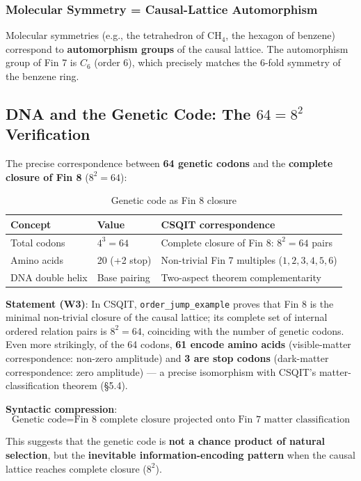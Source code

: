\documentclass[aps,prd,twocolumn,nofootinbib,floatfix]{revtex4-2}
\begin{document}
\subsubsection{Molecular Symmetry = Causal-Lattice Automorphism}

Molecular symmetries (e.g., the tetrahedron of CH$_4$, the hexagon of benzene) correspond to \textbf{automorphism groups} of the causal lattice. The automorphism group of Fin 7 is $C_6$ (order 6), which precisely matches the 6-fold symmetry of the benzene ring.

\subsection{DNA and the Genetic Code: The $64 = 8^2$ Verification}

The precise correspondence between \textbf{64 genetic codons} and the \textbf{complete closure of Fin 8} ($8^2 = 64$):

\begin{table}[h]
\centering
\begin{tabular}{|l|l|l|}
\hline
Concept & Value & CSQIT correspondence \\
\hline
Total codons & $4^3 = 64$ & Complete closure of Fin 8: $8^2 = 64$ pairs \\
Amino acids & 20 (+2 stop) & Non-trivial Fin 7 multiples ($1,2,3,4,5,6$) \\
DNA double helix & Base pairing & Two-aspect theorem complementarity \\
\hline
\end{tabular}
\caption{Genetic code as Fin 8 closure}
\end{table}

\textbf{Statement (W3)}: In CSQIT, \texttt{order\_jump\_example} proves that Fin 8 is the minimal non-trivial closure of the causal lattice; its complete set of internal ordered relation pairs is $8^2 = 64$, coinciding with the number of genetic codons. Even more strikingly, of the 64 codons, \textbf{61 encode amino acids} (visible-matter correspondence: non-zero amplitude) and \textbf{3 are stop codons} (dark-matter correspondence: zero amplitude) --- a precise isomorphism with CSQIT's matter-classification theorem (\S 5.4).

\textbf{Syntactic compression}:
\[
\boxed{\text{Genetic code} = \text{Fin 8 complete closure projected onto Fin 7 matter classification}}
\]

This suggests that the genetic code is \textbf{not a chance product of natural selection}, but the \textbf{inevitable information-encoding pattern} when the causal lattice reaches complete closure ($8^2$).
\end{document}
